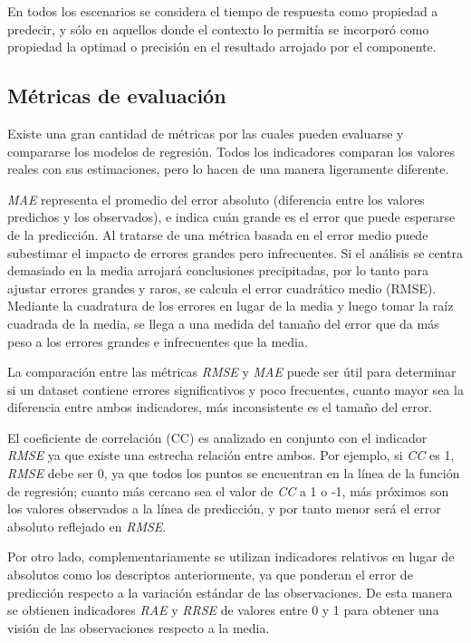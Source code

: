 En todos los escenarios se considera el tiempo de respuesta como propiedad
a predecir, y sólo en aquellos donde el contexto lo permitía se incorporó
como propiedad la optimad o precisión en el resultado arrojado por
el componente. 


\subsection{Métricas de evaluación\label{subsec:M=0000E9tricas-de-evaluaci=0000F3n}}

Existe una gran cantidad de métricas por las cuales pueden evaluarse
y compararse los modelos de regresión. Todos los indicadores comparan
los valores reales con sus estimaciones, pero lo hacen de una manera
ligeramente diferente. 

\emph{\ac{MAE}} representa el promedio del error absoluto (diferencia
entre los valores predichos y los observados), e indica cuán grande
es el error que puede esperarse de la predicción. Al tratarse de una
métrica basada en el error medio puede subestimar el impacto de errores
grandes pero infrecuentes. Si el análisis se centra demasiado en la
media arrojará conclusiones precipitadas, por lo tanto para ajustar
errores grandes y raros, se calcula el error cuadrático medio (\ac{RMSE}).
Mediante la cuadratura de los errores en lugar de la media y luego
tomar la raíz cuadrada de la media, se llega a una medida del tamaño
del error que da más peso a los errores grandes e infrecuentes que
la media. 

La comparación entre las métricas \emph{\ac{RMSE} }y \emph{\ac{MAE}
}puede ser útil para determinar si un dataset contiene errores significativos
y poco frecuentes, cuanto mayor sea la diferencia entre ambos indicadores,
más inconsistente es el tamaño del error.

El coeficiente de correlación (\ac{CC}) es analizado en conjunto
con el indicador \emph{\ac{RMSE}} ya que existe una estrecha relación
entre ambos. Por ejemplo, si \emph{\ac{CC}} es 1, \emph{\ac{RMSE}}
debe ser 0, ya que todos los puntos se encuentran en la línea de la
función de regresión; cuanto más cercano sea el valor de \emph{\ac{CC}}
a 1 o -1, más próximos son los valores observados a la línea de predicción,
y por tanto menor será el error absoluto reflejado en \emph{\ac{RMSE}}. 

Por otro lado, complementariamente se utilizan indicadores relativos
en lugar de absolutos como los descriptos anteriormente, ya que ponderan
el error de predicción respecto a la variación estándar de las observaciones.
De esta manera se obtienen indicadores \emph{\ac{RAE}} y \emph{\ac{RRSE}}
de valores entre 0 y 1 para obtener una visión de las observaciones
respecto a la media. 


